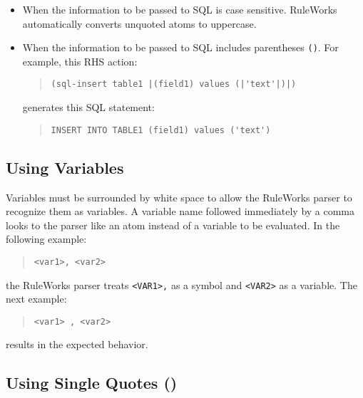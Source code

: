 \begin{itemize}
\item When the information to be passed to SQL is case
  sensitive. RuleWorks automatically converts unquoted atoms to
  uppercase.
\item When the information to be passed to SQL includes parentheses
  \verb|()|. For example, this RHS action:

\begin{quote}
\begin{verbatim}
(sql-insert table1 |(field1) values (|'text'|)|)
\end{verbatim}
\end{quote}

generates this SQL statement:

\begin{quote}
\begin{verbatim}
INSERT INTO TABLE1 (field1) values ('text')
\end{verbatim}
\end{quote}

\end{itemize}
      
\subsection{Using Variables}

Variables must be surrounded by white space to allow the RuleWorks
parser to recognize them as variables. A variable name followed
immediately by a comma looks to the parser like an atom instead of a
variable to be evaluated. In the following example:

\begin{quote}
\begin{verbatim}
<var1>, <var2>
\end{verbatim}
\end{quote}

the RuleWorks parser treats \verb|<VAR1>,| as a symbol and \verb|<VAR2>| as a
variable. The next example:

\begin{quote}
\begin{verbatim}
<var1> , <var2>
\end{verbatim}
\end{quote}

results in the expected behavior.

\subsection{Using Single Quotes ()}

